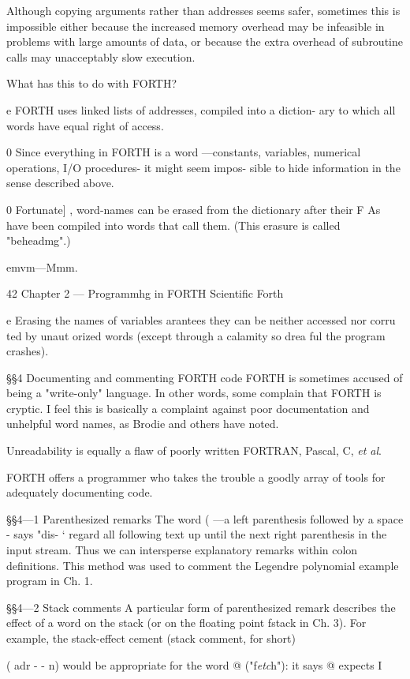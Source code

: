 Although copying arguments rather than addresses seems safer,
sometimes this is impossible either because the increased
memory overhead may be infeasible in problems with large
amounts of data, or because the extra overhead of subroutine calls
may unacceptably slow execution.

What has this to do with FORTH?

e FORTH uses linked lists of addresses, compiled into a diction-
ary to which all words have equal right of access.

0 Since everything in FORTH is a word —constants, variables,
numerical operations, I/O procedures- it might seem impos-
sible to hide information in the sense described above.

0 Fortunate] , word-names can be erased from the dictionary
after their F As have been compiled into words that call them.
(This erasure is called "beheadmg".)

emvm—Mmm.

42 Chapter 2 — Programmhg in FORTH Scientific Forth

e Erasing the names of variables arantees they can be neither
accessed nor corru ted by unaut orized words (except through
a calamity so drea ful the program crashes).

§§4 Documenting and commenting FORTH code
FORTH is sometimes accused of being a "write-only" language. In other words, some complain that FORTH is cryptic. I feel this is basically a complaint against poor documentation and unhelpful word names, as Brodie and others have noted.

Unreadability is equally a ﬂaw of poorly written FORTRAN, Pascal, C, \textit{et al}.

FORTH offers a programmer who takes the trouble a goodly
array of tools for adequately documenting code.

§§4—1 Parenthesized remarks
The word ( —a left parenthesis followed by a space - says "dis- ‘
regard all following text up until the next right parenthesis in
the input stream. Thus we can intersperse explanatory remarks
within colon definitions. This method was used to comment the
Legendre polynomial example program in Ch. 1.

§§4—2 Stack comments
A particular form of parenthesized remark describes the effect of
a word on the stack (or on the ﬂoating point fstack in Ch. 3). For
example, the stack-effect cement (stack comment, for short)

( adr - - n)
would be appropriate for the word @ ("f\textit{etc}h"): it says @ expects I

